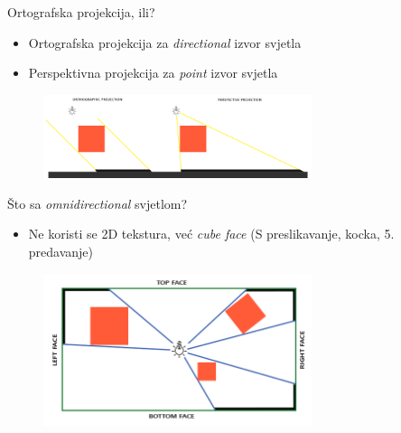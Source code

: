 \documentclass[9pt]{beamer}
\begin{document}
\begin{frame}{Ortografska projekcija, ili?}
	
	\begin{itemize}
		\item Ortografska projekcija za \textit{directional} izvor svjetla
		\item Perspektivna projekcija za \textit{point} izvor svjetla
	\end{itemize}
	\begin{figure}
		\centering
		\includegraphics[width=0.7\textwidth]{slike/shadow_mapping_projection.png}
	\end{figure}
\end{frame}

\begin{frame}{Što sa \textit{omnidirectional} svjetlom?}
	\begin{itemize}
		\item Ne koristi se 2D tekstura, već \textit{cube face} (S preslikavanje, kocka, 5. predavanje)
	\end{itemize}
\begin{figure}
	\centering
	\includegraphics[width=0.7\textwidth]{slike/point_shadows_diagram.png}
\end{figure}
\end{frame}


\end{document}
